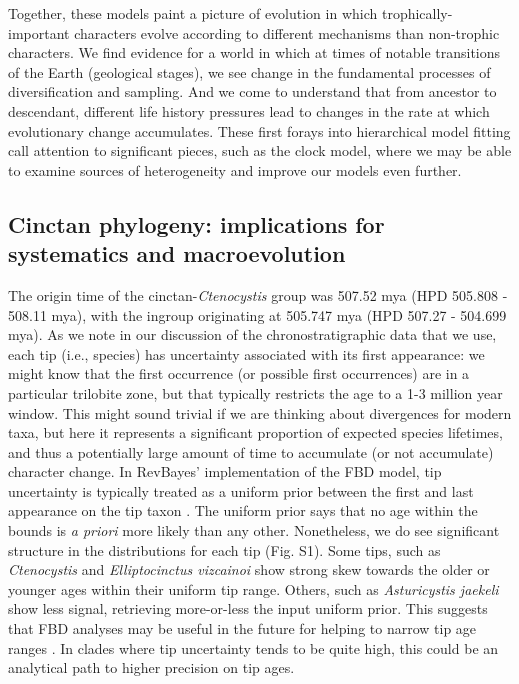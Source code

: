 \documentclass{article}
\begin{document}
Together, these models paint a picture of evolution in which trophically-important characters evolve according to different mechanisms than non-trophic characters.
We find evidence for a world in which at times of notable transitions of the Earth (geological stages), we see change in the fundamental processes of diversification and sampling.
And we come to understand that from ancestor to descendant, different life history pressures lead to changes in the rate at which evolutionary change accumulates. 
These first forays into hierarchical model fitting call attention to significant pieces, such as the clock model, where we may be able to examine sources of heterogeneity and improve our models even further.

\subsection{Cinctan phylogeny: implications for systematics and macroevolution}

The origin time of the cinctan-\textit{Ctenocystis} group was 507.52 mya (HPD 505.808 - 508.11 mya), with the ingroup originating at 505.747 mya (HPD 507.27 - 504.699 mya).
As we note in our discussion of the chronostratigraphic data that we use, each tip (i.e., species) has uncertainty associated with its first appearance: we might know that the first occurrence (or possible first occurrences) are in a particular trilobite zone, but that typically restricts the age to a 1-3 million year window.  This might sound trivial if we are thinking about divergences for modern taxa, but here it represents a significant proportion of expected species lifetimes, and thus a potentially large amount of time to accumulate (or not accumulate) character change.
In RevBayes' implementation of the FBD model, tip uncertainty is typically treated as a uniform prior between the first and last appearance on the tip taxon \citep{baridosottani2020}.
The uniform prior says that no age within the bounds is \textit{a priori} more likely than any other.
Nonetheless, we do see significant structure in the distributions for each tip (Fig. S1). 
Some tips, such as \textit{Ctenocystis} and \textit{Elliptocinctus vizcainoi} show strong skew towards the older or younger ages within their uniform tip range.
Others, such as \textit{Asturicystis jaekeli} show less signal, retrieving more-or-less the input uniform prior.
This suggests that FBD analyses may be useful in the future for helping to narrow tip age ranges \citep{Drummond2016, beck2020}.
In clades where tip uncertainty tends to be quite high, this could be an analytical path to higher precision on tip ages.
\end{document}

